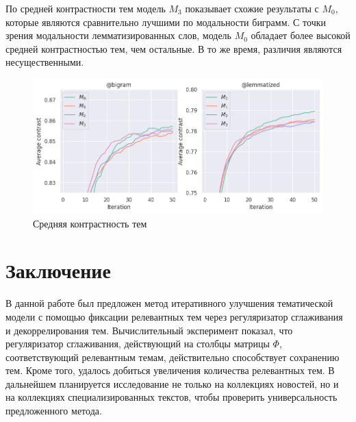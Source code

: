\documentclass{article}
\begin{document}
По средней контрастности тем модель $M_3$ показывает схожие результаты с $M_0$, которые являются сравнительно лучшими по модальности биграмм.
С точки зрения модальности лемматизированных слов, модель $M_0$ обладает более высокой средней контрастностью тем, чем остальные.
В то же время, различия являются несущественными.

\begin{figure}[h]
\includegraphics[width=12cm]
{figures/avg_contrast_v3.png}
\centering
\caption{Средняя контрастность тем}
\end{figure}

\section{Заключение}

В данной работе был предложен метод итеративного улучшения тематической модели с помощью фиксации релевантных тем через регуляризатор сглаживания и декоррелирования тем.
Вычислительный эксперимент показал, что регуляризатор сглаживания, действующий на столбцы матрицы $\Phi$, соответствующий релевантным темам, действительно способствует сохранению тем.
Кроме того, удалось добиться увеличения количества релевантных тем.
В дальнейшем планируется исследование не только на коллекциях новостей, но и на коллекциях специализированных текстов, чтобы проверить универсальность предложенного метода.



\end{document}
